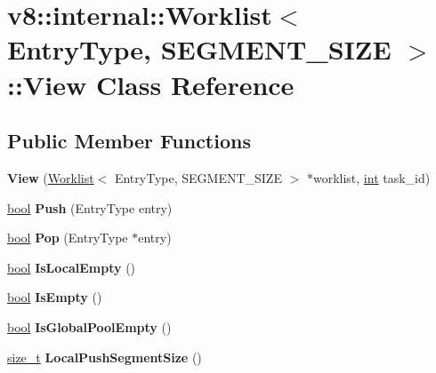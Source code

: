 \hypertarget{classv8_1_1internal_1_1Worklist_1_1View}{}\section{v8\+:\+:internal\+:\+:Worklist$<$ Entry\+Type, S\+E\+G\+M\+E\+N\+T\+\_\+\+S\+I\+ZE $>$\+:\+:View Class Reference}
\label{classv8_1_1internal_1_1Worklist_1_1View}
\subsection*{Public Member Functions}
\begin{DoxyCompactItemize}
\item 
\mbox{\label{classv8_1_1internal_1_1Worklist_1_1View_ad7444d32fee30488f4e13a684bde2268}} 
{\bfseries View} (\mbox{\hyperlink{classv8_1_1internal_1_1Worklist}{Worklist}}$<$ Entry\+Type, S\+E\+G\+M\+E\+N\+T\+\_\+\+S\+I\+ZE $>$ $\ast$worklist, \mbox{\hyperlink{classint}{int}} task\+\_\+id)
\item 
\mbox{\label{classv8_1_1internal_1_1Worklist_1_1View_ad78a02030bf93416197baedca4899719}} 
\mbox{\hyperlink{classbool}{bool}} {\bfseries Push} (Entry\+Type entry)
\item 
\mbox{\label{classv8_1_1internal_1_1Worklist_1_1View_aa27c471c808772dc1e46b21bbb4f3623}} 
\mbox{\hyperlink{classbool}{bool}} {\bfseries Pop} (Entry\+Type $\ast$entry)
\item 
\mbox{\label{classv8_1_1internal_1_1Worklist_1_1View_a25e9f0b4a479ccfcc10060d599b18617}} 
\mbox{\hyperlink{classbool}{bool}} {\bfseries Is\+Local\+Empty} ()
\item 
\mbox{\label{classv8_1_1internal_1_1Worklist_1_1View_a498f8e2b5579d99ac7312d594ba8a6bb}} 
\mbox{\hyperlink{classbool}{bool}} {\bfseries Is\+Empty} ()
\item 
\mbox{\label{classv8_1_1internal_1_1Worklist_1_1View_ac0b2c1e83fbc5a77339b9d5eeace380d}} 
\mbox{\hyperlink{classbool}{bool}} {\bfseries Is\+Global\+Pool\+Empty} ()
\item 
\mbox{\label{classv8_1_1internal_1_1Worklist_1_1View_af1ca29c579416c883928a028357c3703}} 
\mbox{\hyperlink{classsize__t}{size\+\_\+t}} {\bfseries Local\+Push\+Segment\+Size} ()
\end{DoxyCompactItemize}


